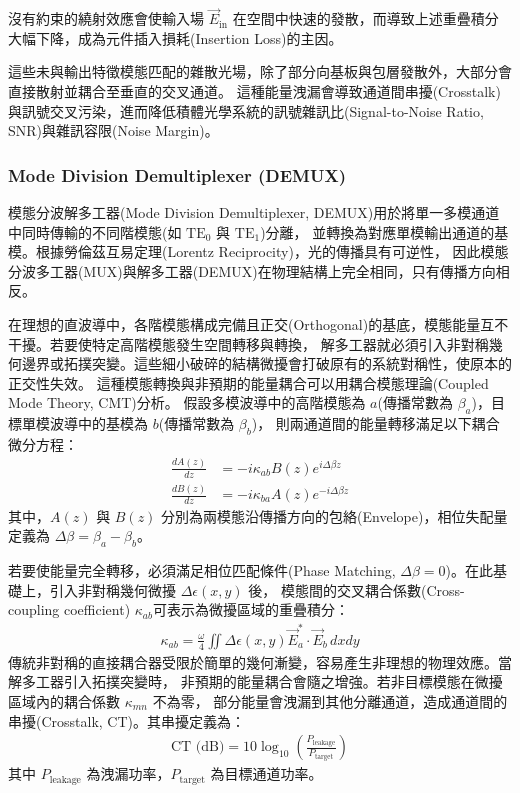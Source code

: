 沒有約束的繞射效應會使輸入場 $\vec{E}_{\text{in}}$ 在空間中快速的發散，而導致上述重疊積分大幅下降，成為元件插入損耗(Insertion Loss)的主因。

這些未與輸出特徵模態匹配的雜散光場，除了部分向基板與包層發散外，大部分會直接散射並耦合至垂直的交叉通道。
這種能量洩漏會導致通道間串擾(Crosstalk)與訊號交叉污染，進而降低積體光學系統的訊號雜訊比(Signal-to-Noise Ratio, SNR)與雜訊容限(Noise Margin)。\

\subsubsection{Mode Division Demultiplexer (DEMUX)}
模態分波解多工器(Mode Division Demultiplexer, DEMUX)用於將單一多模通道中同時傳輸的不同階模態(如 $\text{TE}_0$ 與 $\text{TE}_1$)分離，
並轉換為對應單模輸出通道的基模。根據勞倫茲互易定理(Lorentz Reciprocity)，光的傳播具有可逆性，
因此模態分波多工器(MUX)與解多工器(DEMUX)在物理結構上完全相同，只有傳播方向相反。

在理想的直波導中，各階模態構成完備且正交(Orthogonal)的基底，模態能量互不干擾。若要使特定高階模態發生空間轉移與轉換，
解多工器就必須引入非對稱幾何邊界或拓撲突變。這些細小破碎的結構微擾會打破原有的系統對稱性，使原本的正交性失效。
這種模態轉換與非預期的能量耦合可以用耦合模態理論(Coupled Mode Theory, CMT)\cite{yariv2007_photonics}分析。
假設多模波導中的高階模態為 $a$(傳播常數為 $\beta_a$)，目標單模波導中的基模為 $b$(傳播常數為 $\beta_b$)，
則兩通道間的能量轉移滿足以下耦合微分方程：
\begin{align}
\frac{dA(z)}{dz} &= -i \kappa_{ab} B(z) e^{i\Delta\beta z} \\
\frac{dB(z)}{dz} &= -i \kappa_{ba} A(z) e^{-i\Delta\beta z}
\label{eq:mode coupling of directional coupler}
\end{align}
其中，$A(z)$ 與 $B(z)$ 分別為兩模態沿傳播方向的包絡(Envelope)，相位失配量定義為 $\Delta\beta = \beta_a - \beta_b$。

若要使能量完全轉移，必須滿足相位匹配條件(Phase Matching, $\Delta\beta = 0$)。在此基礎上，引入非對稱幾何微擾 $\Delta \epsilon(x,y)$ 後，
模態間的交叉耦合係數(Cross-coupling coefficient) \cite{yariv2007_photonics}$\kappa_{ab}$可表示為微擾區域的重疊積分：
\begin{align}
\kappa_{ab} = \frac{\omega}{4} \iint \Delta \epsilon(x,y) \vec{E}_a^* \cdot \vec{E}_b \, dx dy
\label{eq:mode cross coupling coefficient}
\end{align}
傳統非對稱的直接耦合器受限於簡單的幾何漸變，容易產生非理想的物理效應。當解多工器引入拓撲突變時，
非預期的能量耦合會隨之增強。若非目標模態在微擾區域內的耦合係數 $\kappa_{mn}$ 不為零，
部分能量會洩漏到其他分離通道，造成通道間的串擾(Crosstalk, CT)。其串擾定義為：
\begin{align}
\text{CT (dB)} = 10 \log_{10} \left( \frac{P_{\text{leakage}}}{P_{\text{target}}} \right)
\label{eq:crosstalk}
\end{align}
其中 $P_{\text{leakage}}$ 為洩漏功率，$P_{\text{target}}$ 為目標通道功率。

